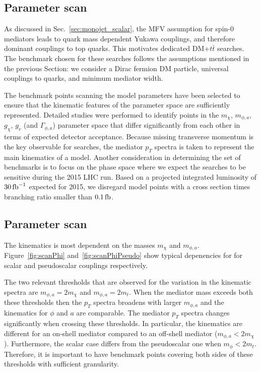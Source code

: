 \subsection{Parameter scan}

As discussed in Sec.~\ref{sec:monojet_scalar}, the MFV assumption for spin-$0$ mediators leads to quark mass dependent Yukawa couplings, and therefore dominant couplings to top quarks. This motivates dedicated DM+$t\bar{t}$ searches. 
The benchmark chosen for these searches follows the assumptions mentioned in the previous Section: we consider 
a Dirac fermion DM particle, universal couplings to quarks, and minimum mediator width. 
 
The benchmark points scanning the model parameters have been selected to ensure that the kinematic features of the parameter space are sufficiently represented. Detailed studies were performed to identify points in the $m_{\chi}$, $m_{\phi,a}$, $g_{\chi}$, $g_{v}$ (and $\Gamma_{\phi,a}$) parameter space that differ significantly from each other in terms of expected detector acceptance. Because missing transverse momentum is the key observable for searches, the mediator $p_{T}$ spectra is taken to represent the main kinematics of a model. Another consideration in determining the set of benchmarks is to focus on the phase space where we expect the searches to be sensitive during the 2015 LHC run. Based on a projected integrated luminosity of $30\,{\rm fb}^{-1}$ expected for 2015, we disregard model points with a cross section times branching ratio smaller than $0.1\,{\rm fb}$.

\subsection{Parameter scan}

The kinematics is most dependent on the masses $m_{\chi}$ and $m_{\phi,a}$. Figure~\ref{fig:scanPhi} and~\ref{fig:scanPhiPseudo} show typical depenencies for for scalar and pseudoscalar couplings respectively.

The two relevant thresholds that are observed for the variation in the kinematic spectra 
are $m_{\phi,a} = 2m_{\chi}$ and $m_{\phi,a} = 2m_t$. When the mediator mass exceeds both 
these thresholds then the $p_{T}$ spectra broadens with larger $m_{\phi,a}$ and the kinematics 
for $\phi$ and $a$ are comparable. The mediator $p_{T}$ spectra changes significantly when 
crossing these thresholds. In particular, the kinematics are different for an on-shell mediator 
compared to an off-shell mediator ($m_{\phi,a}<2m_{\chi}$). 
Furthermore, the scalar case differs from the pseudoscalar one when $m_{\phi}<2m_t$. 
Therefore, it is important to have benchmark points covering both sides of these thresholds
with sufficient granularity.

